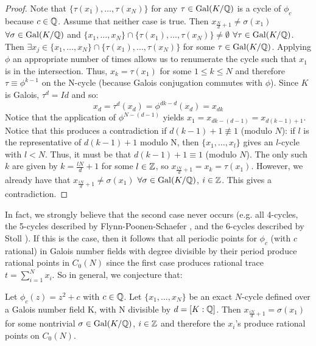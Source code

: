 \begin{proof}
	Note that $\{\tau(x_1), \ldots, \tau(x_{N})\}$ for any $\tau \in 
	\mathrm{Gal}(K/\mathbb{Q})$ is a cycle of $\phi_c$ because $c \in \mathbb{Q}$. Assume 
	that neither case is true. Then $x_{\frac{N}{d}+1} \neq \sigma(
	x_1)$ $\forall \sigma \in \mathrm{Gal}(K/\mathbb{Q})$ and $\{x_1, \ldots, x_{N}\} 
	\cap \{\tau(x_1), \ldots, \tau(x_{N})\} \neq \emptyset$ $\forall 
	\tau \in \mathrm{Gal}(K/\mathbb{Q})$. Then $\exists x_j \in \{x_1, \ldots, x_{N}\}
	\cap \{\tau(x_1), \ldots, \tau(x_{N})\}$ for some $\tau \in \mathrm{Gal}(K/
	\mathbb{Q})$. Applying $\phi$ an appropriate number of times allows us to 
	renumerate the cycle	such that $x_1$ is in the intersection. 
	Thus, $x_k = \tau(x_1)$ for some $1 \leq k \leq N$ and therefore $
	\tau \equiv \phi^{k-1}$ on the N-cycle (because Galois conjugation 
	commutes with $\phi$). Since $K$ is Galois, $\tau^d = Id$ and so:
	\[
		x_d = \tau^d(x_d) = \phi^{dk-d}(x_d) = x_{dk}
	\]
	Notice that the application of $\phi^{N-(d-1)}$ yields $x_1 =
	x_{dk-(d-1)} = x_{d(k-1) + 1}$. Notice that this produces a
	contradiction if $d(k-1) + 1 \not\equiv 1$ (modulo $N$): if $l$
	is the representative of $d(k-1) + 1$ modulo N, then $\{x_1, \ldots
	, x_l\}$ gives an $l$-cycle with $l < N$. Thus, it must be that
	$d(k-1) + 1 \equiv 1$ (modulo $N$). The only such $k$ are given
	by $k = \frac{lN}{d} + 1$ for some $l \in \mathbb{Z}$, so $x_{\frac{lN}{d}
	+ 1} = x_k = \tau(x_1)$.	However, we already have that
	$x_{\frac{iN}{d}+1} \neq \sigma(x_1)$ $\forall \sigma \in \mathrm{Gal}(K/\mathbb{Q})$,
	$i \in \mathbb{Z}$. This gives a contradiction.
\end{proof}

In fact, we strongly believe that the second case never occurs (e.g.
all 4-cycles, the 5-cycles described by Flynn-Poonen-Schaefer
\cite{MR1480542}, and the 6-cycles described by Stoll \cite{MR2465796}).
If this is the case, then it follows that all periodic points
for $\phi_c$ (with $c$ rational) in Galois number fields with degree
divisible by their period produce rational points in $C_0(N)$ since the
first case produces rational trace $t = \sum\limits_{i=1}^N x_i$. So in
general, we conjecture that:

\begin{conjecture}
	Let $\phi_c(z) = z^2 + c$ with $c \in \mathbb{Q}$. Let $\{x_1, \ldots, x_{N}\}$ be
	an exact $N$-cycle defined over a Galois number field K, with N 
	divisible by	$d = [K:\mathbb{Q} ]$. Then $x_{\frac{iN}{d}+1} = \sigma(x_1)$
	for some nontrivial $\sigma \in \mathrm{Gal}(K/\mathbb{Q})$, $i \in \mathbb{Z}$ and therefore the
	$x_i$'s produce rational points on $C_0(N)$.
\end{conjecture}

